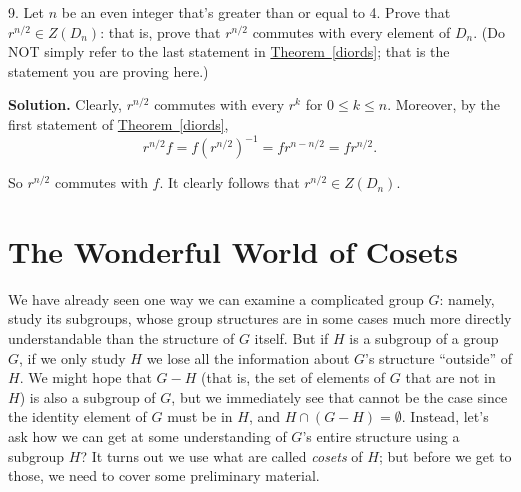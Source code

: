 \documentclass[10pt,]{book}
\theoremstyle{plain}
\theoremstyle{definition}
\theoremstyle{definition}
\theoremstyle{definition}
\theoremstyle{definition}
\numberwithin{equation}{section}
\begin{document}
\begin{exerciselist}
\item[9.]\hypertarget{exercise-49}{}Let \(n\) be an even integer that's greater than or equal to 4. Prove that \(r^{n/2}\in Z(D_n)\): that is, prove that \(r^{n/2}\) commutes with every element of \(D_n\). (Do NOT simply refer to the last statement in \hyperref[diords]{Theorem~\ref{diords}}; that is the statement you are proving here.)%
\par\smallskip
\par\smallskip
\noindent\textbf{Solution.}\hypertarget{solution-49}{}\quad
Clearly, \(r^{n/2}\) commutes with every \(r^k\) for \(0\leq k\leq n\). Moreover, by the first statement of \hyperref[diords]{Theorem~\ref{diords}},%
\begin{equation*}
r^{n/2}f=f(r^{n/2})^{-1}=fr^{n-n/2}=fr^{n/2}.
\end{equation*}
%
\par
So \(r^{n/2}\) commutes with \(f\). It clearly follows that \(r^{n/2}\in Z(D_n)\).%
\end{exerciselist}
\typeout{************************************************}
\typeout{************************************************}
\chapter[{The Wonderful World of Cosets}]{The Wonderful World of Cosets}\label{coslag}
We have already seen one way we can examine a complicated group \(G\): namely, study its subgroups, whose group structures are in some cases much more directly understandable than the structure of \(G\) itself. But if \(H\) is a subgroup of a group \(G\), if we only study \(H\) we lose all the information about \(G\)'s structure ``outside'' of \(H\). We might hope that \(G-H\) (that is, the set of elements of \(G\) that are not in \(H\)) is also a subgroup of \(G\), but we immediately see that cannot be the case since the identity element of \(G\) must be in \(H\), and \(H\cap (G-H)=\emptyset\). Instead, let's ask how we can get at some understanding of \(G\)'s entire structure using a subgroup \(H\)? It turns out we use what are called \emph{cosets} of \(H\); but before we get to those, we need to cover some preliminary material.%
\typeout{************************************************}
\typeout{************************************************}
\end{document}
